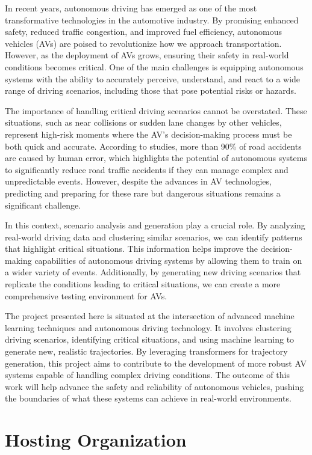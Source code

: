 \documentclass[12pt,a4paper]{report}
\begin{document}
In recent years, autonomous driving has emerged as one of the most transformative technologies in the automotive industry. By promising enhanced safety, reduced traffic congestion, and improved fuel efficiency, autonomous vehicles (AVs) are poised to revolutionize how we approach transportation. However, as the deployment of AVs grows, ensuring their safety in real-world conditions becomes critical. One of the main challenges is equipping autonomous systems with the ability to accurately perceive, understand, and react to a wide range of driving scenarios, including those that pose potential risks or hazards.

The importance of handling critical driving scenarios cannot be overstated. These situations, such as near collisions or sudden lane changes by other vehicles, represent high-risk moments where the AV's decision-making process must be both quick and accurate. According to studies, more than 90\% of road accidents are caused by human error, which highlights the potential of autonomous systems to significantly reduce road traffic accidents if they can manage complex and unpredictable events. However, despite the advances in AV technologies, predicting and preparing for these rare but dangerous situations remains a significant challenge.

In this context, scenario analysis and generation play a crucial role. By analyzing real-world driving data and clustering similar scenarios, we can identify patterns that highlight critical situations. This information helps improve the decision-making capabilities of autonomous driving systems by allowing them to train on a wider variety of events. Additionally, by generating new driving scenarios that replicate the conditions leading to critical situations, we can create a more comprehensive testing environment for AVs.

The project presented here is situated at the intersection of advanced machine learning techniques and autonomous driving technology. It involves clustering driving scenarios, identifying critical situations, and using machine learning to generate new, realistic trajectories. By leveraging transformers for trajectory generation, this project aims to contribute to the development of more robust AV systems capable of handling complex driving conditions. The outcome of this work will help advance the safety and reliability of autonomous vehicles, pushing the boundaries of what these systems can achieve in real-world environments.


\section{Hosting Organization}
\end{document}
